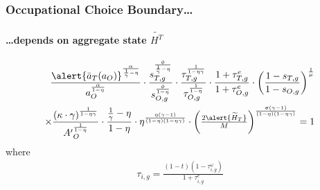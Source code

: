 \documentclass[11pt]{beamer}
\begin{document}
\begin{frame}
\frametitle{Occupational Choice Boundary\ldots}
\framesubtitle{\ldots depends on aggregate state $\widetilde{H^T}$} 
\begin{align*}
	\frac{\alert{\bar{a}_T(a_O)}^\frac{\alpha}{\frac{1}{\gamma}-\eta}}{a_O^\frac{\alpha}{1-\eta}} \cdot \frac{s_{T,g}^\frac{\phi}{\frac{1}{\gamma}-\eta}}{s_{O,g}^\frac{\phi}{1-\eta}}\cdot \frac{\tau_{T,g}^\frac{1}{1-\eta\gamma}}{\tau_{O,g}^\frac{1}{1-\eta}} \cdot \frac{1+\tau^e_{T,g}}{1+\tau^e_{O,g}}\cdot \left(\frac{1-s_{T,g}}{1-s_{O,g}}\right)^\frac{1}{\mu} \nonumber\\
	\times \frac{\left(\kappa \cdot \gamma\right)^\frac{1}{1-\eta\gamma}}{{A'}_O^\frac{1}{1-\eta}} \cdot \frac{\frac{1}{\gamma}-\eta}{1-\eta}\cdot \eta^\frac{\eta(\gamma-1)}{(1-\eta)(1-\eta\gamma)} \cdot \left(\tfrac{2\alert{\widetilde{H}_T}}{M}\right)^{\frac{\sigma(\gamma-1)}{(1-\eta)(1-\eta\gamma)}}=1 \nonumber%
\end{align*}
where
\begin{align}
	\tau_{i,g} =\frac{(1-t)(1-\tau^{\omega}_{i,g})}{1+\tau^e_{i,g}} \nonumber
\end{align}
\end{frame}
\end{document}
